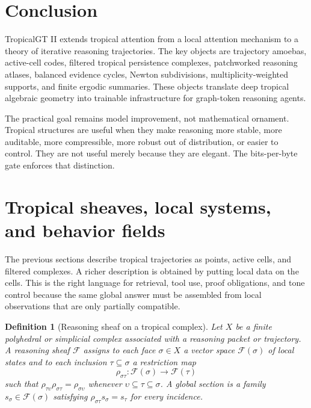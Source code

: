 \documentclass[11pt]{article}
\newtheorem{definition}{Definition}[section]
\newcommand{\calF}{\mathcal{F}}
\begin{document}
\section{Conclusion}

TropicalGT II extends tropical attention from a local attention mechanism to a theory of iterative reasoning trajectories.  The key objects are trajectory amoebas, active-cell codes, filtered tropical persistence complexes, patchworked reasoning atlases, balanced evidence cycles, Newton subdivisions, multiplicity-weighted supports, and finite ergodic summaries.  These objects translate deep tropical algebraic geometry into trainable infrastructure for graph-token reasoning agents.

The practical goal remains model improvement, not mathematical ornament.  Tropical structures are useful when they make reasoning more stable, more auditable, more compressible, more robust out of distribution, or easier to control.  They are not useful merely because they are elegant.  The bits-per-byte gate enforces that distinction.


\section{Tropical sheaves, local systems, and behavior fields}

The previous sections describe tropical trajectories as points, active cells, and filtered complexes.  A richer description is obtained by putting local data on the cells.  This is the right language for retrieval, tool use, proof obligations, and tone control because the same global answer must be assembled from local observations that are only partially compatible.

\begin{definition}[Reasoning sheaf on a tropical complex]
Let \(X\) be a finite polyhedral or simplicial complex associated with a reasoning packet or trajectory.  A reasoning sheaf \(\calF\) assigns to each face \(\sigma\in X\) a vector space \(\calF(\sigma)\) of local states and to each inclusion \(\tau\subseteq\sigma\) a restriction map
\begin{equation}
\rho_{\sigma\tau}:\calF(\sigma)\to\calF(\tau)
\end{equation}
such that \(\rho_{\tau\upsilon}\rho_{\sigma\tau}=\rho_{\sigma\upsilon}\) whenever \(\upsilon\subseteq\tau\subseteq\sigma\).  A global section is a family \(s_\sigma\in\calF(\sigma)\) satisfying \(\rho_{\sigma\tau}s_\sigma=s_\tau\) for every incidence.
\end{definition}
\end{document}
